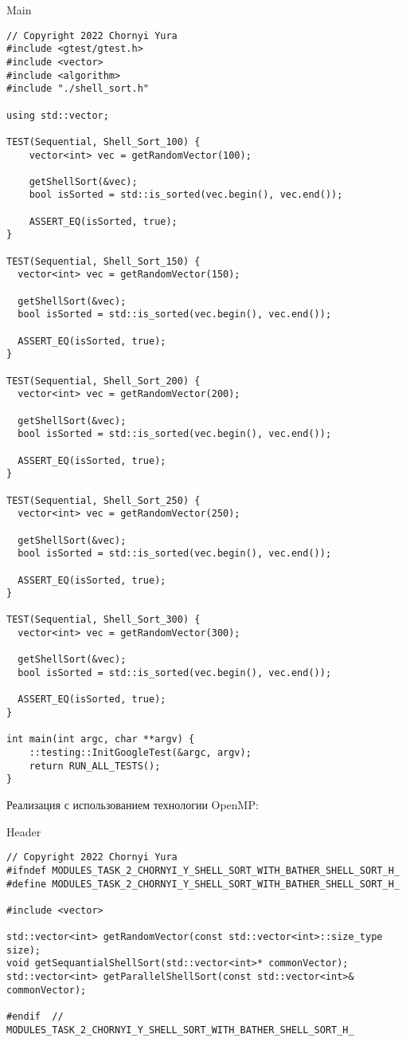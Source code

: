 \documentclass{report}
\begin{document}
\begin{center}
Main
\end{center}
\begin{lstlisting}
// Copyright 2022 Chornyi Yura
#include <gtest/gtest.h>
#include <vector>
#include <algorithm>
#include "./shell_sort.h"

using std::vector;

TEST(Sequential, Shell_Sort_100) {
    vector<int> vec = getRandomVector(100);

    getShellSort(&vec);
    bool isSorted = std::is_sorted(vec.begin(), vec.end());

    ASSERT_EQ(isSorted, true);
}

TEST(Sequential, Shell_Sort_150) {
  vector<int> vec = getRandomVector(150);

  getShellSort(&vec);
  bool isSorted = std::is_sorted(vec.begin(), vec.end());

  ASSERT_EQ(isSorted, true);
}

TEST(Sequential, Shell_Sort_200) {
  vector<int> vec = getRandomVector(200);

  getShellSort(&vec);
  bool isSorted = std::is_sorted(vec.begin(), vec.end());

  ASSERT_EQ(isSorted, true);
}

TEST(Sequential, Shell_Sort_250) {
  vector<int> vec = getRandomVector(250);

  getShellSort(&vec);
  bool isSorted = std::is_sorted(vec.begin(), vec.end());

  ASSERT_EQ(isSorted, true);
}

TEST(Sequential, Shell_Sort_300) {
  vector<int> vec = getRandomVector(300);

  getShellSort(&vec);
  bool isSorted = std::is_sorted(vec.begin(), vec.end());

  ASSERT_EQ(isSorted, true);
}

int main(int argc, char **argv) {
    ::testing::InitGoogleTest(&argc, argv);
    return RUN_ALL_TESTS();
}
\end{lstlisting}

\newpage

\par Реализация с использованием технологии OpenMP:
\begin{center}
Header
\end{center}
\begin{lstlisting}
// Copyright 2022 Chornyi Yura
#ifndef MODULES_TASK_2_CHORNYI_Y_SHELL_SORT_WITH_BATHER_SHELL_SORT_H_
#define MODULES_TASK_2_CHORNYI_Y_SHELL_SORT_WITH_BATHER_SHELL_SORT_H_

#include <vector>

std::vector<int> getRandomVector(const std::vector<int>::size_type size);
void getSequantialShellSort(std::vector<int>* commonVector);
std::vector<int> getParallelShellSort(const std::vector<int>& commonVector);

#endif  // MODULES_TASK_2_CHORNYI_Y_SHELL_SORT_WITH_BATHER_SHELL_SORT_H_
\end{lstlisting}
\end{document}
